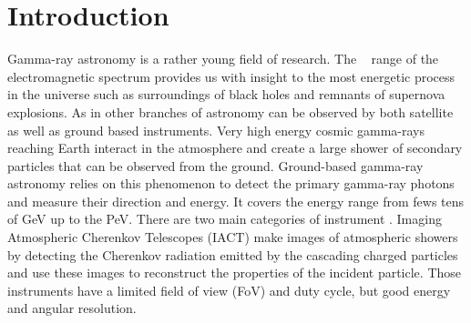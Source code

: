 \section{Introduction}
\label{sec:introduction}


Gamma-ray astronomy is a rather young field of research. The \gammaray~
range of the electromagnetic spectrum provides us with insight to the
most energetic process in the universe such as surroundings of
black holes and remnants of supernova explosions. As in other
branches of astronomy \gammarays can be observed by both
satellite as well as ground based instruments.
Very high energy cosmic gamma-rays reaching Earth interact in the atmosphere and
create a large shower of secondary particles that can be observed from the ground.
Ground-based gamma-ray astronomy relies on this phenomenon to detect the
primary gamma-ray photons and measure their direction and energy.
It covers the energy range from fews tens of GeV up to the PeV.
There are two main categories of instrument \citep{2015CRPhy..16..610D}.
Imaging Atmospheric Cherenkov Telescopes (IACT) make images of atmospheric showers
by detecting the Cherenkov radiation emitted by the cascading charged particles and
use these images to reconstruct the properties of the incident particle.
Those instruments have a limited field of view (FoV) and duty cycle, but
good energy and angular resolution.

